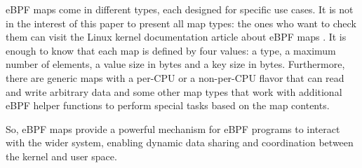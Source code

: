 eBPF maps come in different types, each designed for specific use cases.
It is not in the interest of this paper to present all map types: the ones who want to check them can visit the Linux kernel documentation article about eBPF maps \cite{eBPFLinuxMaps}.
It is enough to know that each map is defined by four values: a type, a maximum number of elements, a value size in bytes and a key size in bytes.
Furthermore, there are generic maps with a per-CPU or a non-per-CPU flavor that can read and write arbitrary data and some other map types that work with additional eBPF helper functions to perform special tasks based on the map contents.

So, eBPF maps provide a powerful mechanism for eBPF programs to interact with the wider system, enabling dynamic data sharing and coordination between the kernel and user space.
